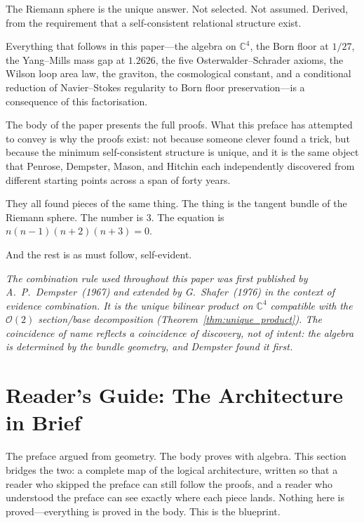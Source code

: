 \documentclass[11pt,a4paper]{article}
\theoremstyle{definition}
\theoremstyle{remark}
\newcommand{\C}{\mathbb{C}}
\begin{document}
The Riemann sphere is the unique answer. Not selected. Not assumed. Derived, from the requirement that a self-consistent relational structure exist.

Everything that follows in this paper---the algebra on $\C^4$, the Born floor at $1/27$, the Yang--Mills mass gap at $1.2626$, the five Osterwalder--Schrader axioms, the Wilson loop area law, the graviton, the cosmological constant, and a conditional reduction of Navier--Stokes regularity to Born floor preservation---is a consequence of this factorisation.

The body of the paper presents the full proofs. What this preface has attempted to convey is why the proofs exist: not because someone clever found a trick, but because the minimum self-consistent structure is unique, and it is the same object that Penrose, Dempster, Mason, and Hitchin each independently discovered from different starting points across a span of forty years.

They all found pieces of the same thing. The thing is the tangent bundle of the Riemann sphere. The number is $3$. The equation is $n(n-1)(n+2)(n+3)=0$.

And the rest is as must follow, self-evident.

\medskip

\noindent\emph{The combination rule used throughout this paper was first published by A.~P.~Dempster~(1967) and extended by G.~Shafer~(1976) in the context of evidence combination. It is the unique bilinear product on $\C^4$ compatible with the $\mathcal{O}(2)$ section/base decomposition (Theorem~\ref{thm:unique_product}). The coincidence of name reflects a coincidence of discovery, not of intent: the algebra is determined by the bundle geometry, and Dempster found it first.}

\newpage

\tableofcontents
\newpage

\section*{Reader's Guide: The Architecture in Brief}

The preface argued from geometry. The body proves with algebra. This section bridges the two: a complete map of the logical architecture, written so that a reader who skipped the preface can still follow the proofs, and a reader who understood the preface can see exactly where each piece lands. Nothing here is proved---everything is proved in the body. This is the blueprint.
\end{document}
